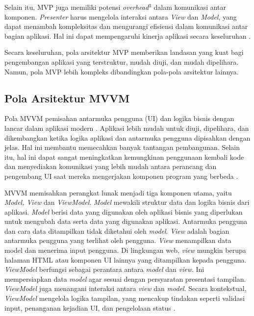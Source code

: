 \documentclass[conference]{IEEEtran}
\begin{document}
	Selain itu, MVP juga memiliki potensi  \textit{overhead}$^3$ dalam komunikasi antar komponen. \textit{Presenter} harus mengelola interaksi antara  \textit{View} dan \textit{Model}, yang dapat menambah kompleksitas dan mengurangi efisiensi dalam komunikasi antar bagian aplikasi. Hal ini dapat mempengaruhi kinerja aplikasi secara keseluruhan \cite{brp2020}.
	
	Secara keseluruhan, pola arsitektur MVP memberikan landasan yang kuat bagi pengembangan aplikasi yang terstruktur, mudah diuji, dan mudah dipelihara. Namun, pola MVP lebih kompleks dibandingkan pola-pola arsitektur lainnya.
	
	\thispagestyle{secondpagestyle}
	
	\subsection{Pola Arsitektur MVVM}
	Pola MVVM pemisahan antarmuka pengguna (UI) dan logika bisnis dengan lancar dalam aplikasi modern \cite{Kom2022,Car2022}. Aplikasi lebih mudah untuk diuji, dipelihara, dan dikembangkan ketika logika aplikasi dan antarmuka pengguna dipisahkan dengan jelas. Hal ini membantu memecahkan banyak tantangan pembangunan. Selain itu, hal ini dapat sangat meningkatkan kemungkinan penggunaan kembali kode dan menyediakan komunikasi yang lebih mudah antara perancang dan pengembang UI saat mereka mengerjakan komponen program yang berbeda \cite{michael2023}. 
	
	MVVM memisahkan perangkat lunak menjadi tiga komponen utama, yaitu \textit{Model, View} dan \textit{ViewModel}. \textit{Model} mewakili struktur data dan logika bisnis dari aplikasi. \textit{Model} berisi data yang digunakan oleh aplikasi bisnis yang diperlukan untuk mengubah data serta data yang digunakan aplikasi. Antarmuka pengguna dan cara data ditampilkan tidak diketahui oleh \textit{model}.
	\textit{View} adalah bagian antarmuka pengguna yang terlihat oleh pengguna. \textit{View} menampilkan data model dan menerima input pengguna. Di lingkungan web, \textit{view} mungkin berupa halaman HTML atau komponen UI lainnya yang ditampilkan kepada pengguna.
	\textit{ViewModel} berfungsi sebagai perantara antara \textit{model} dan \textit{view}. Ini mempersiapkan data \textit{model} agar sesuai dengan persyaratan presentasi tampilan. \textit{ViewModel} juga menangani interaksi antara \textit{view} dan \textit{model}. Secara kontekstual, \textit{ViewModel} mengelola logika tampilan, yang mencakup tindakan seperti validasi input, penanganan kejadian UI, dan pengelolaan status \cite{Martin2024}.
	
\end{document}
